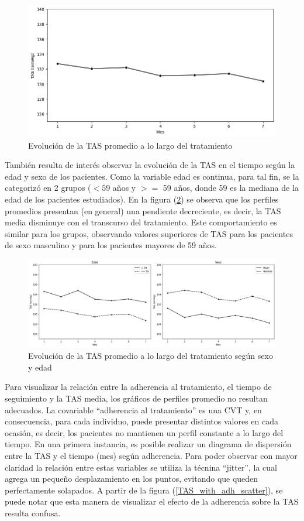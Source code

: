 \documentclass[spanish]{article}
\numberwithin{figure}{subsection}
\numberwithin{equation}{subsection}
\numberwithin{table}{subsection}
\begin{document}
\begin{figure}[H]
	\centering
	\includegraphics[scale=0.5]{img/TAS_vs_tpo.png}
	\caption{Evolución de la TAS promedio a lo largo del tratamiento}
	\label{TAS_vs_tpo}
\end{figure}

También resulta de interés observar la evolución de la TAS en el tiempo según la
edad y sexo de los pacientes. Como la variable edad es continua, para tal fin,
se la categorizó en 2 grupos ($< 59$ años y $>=$ 59 años, donde 59 es la mediana de la
edad de los pacientes estudiados). En la figura (\ref{TAS_with_covs}) se observa
que los perfiles promedios presentan (en general) una pendiente decreciente, es
decir, la TAS media disminuye con el transcurso del tratamiento. Este
comportamiento es similar para los grupos, observando valores superiores de TAS
para los pacientes de sexo masculino y para los pacientes mayores de 59 años. 

\begin{figure}[H]
	\centering
	\includegraphics[scale=0.4]{img/TAS_vs_tpo_with_covs.png}
	\caption{Evolución de la TAS promedio a lo largo del tratamiento según sexo y edad}
	\label{TAS_with_covs}
\end{figure}

Para visualizar la relación entre la adherencia al tratamiento, el tiempo de
seguimiento y la TAS media, los gráficos de perfiles promedio no resultan
adecuados. La covariable ``adherencia al tratamiento'' es una CVT y, en
consecuencia, para cada individuo, puede presentar distintos valores en cada
ocasión, es decir, los pacientes no mantienen un perfil constante a lo largo del
tiempo. En una primera instancia, es posible realizar un diagrama de dispersión
entre la TAS y el tiempo (mes) según adherencia. Para poder observar con mayor
claridad la relación entre estas variables se utiliza la técnina ``jitter'', la
cual agrega un pequeño desplazamiento en los puntos, evitando que queden
perfectamente solapados. A partir de la figura (\ref{TAS_with_adh_scatter}), se
puede notar que esta manera de visualizar el efecto de la adherencia sobre la
TAS resulta confusa.
\end{document}
